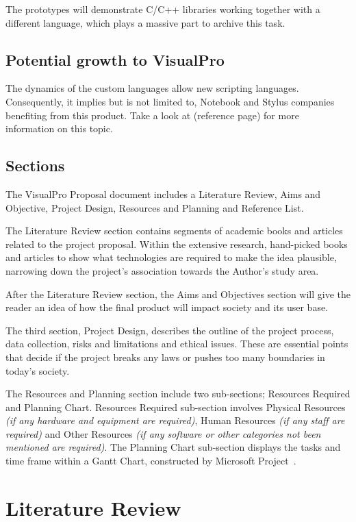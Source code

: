 \documentclass[conference]{IEEEtran}
\begin{document}
      The prototypes will demonstrate C/C++ libraries working together with a different language, which plays a massive part to archive this task.

      \subsection{Potential growth to VisualPro}
      The dynamics of the custom languages allow new scripting languages. Consequently, it implies but is not limited to, Notebook and Stylus companies benefiting from this product. Take a look at (reference page) for more information on this topic.

      \subsection{Sections}
      The VisualPro Proposal document includes a Literature Review, Aims and Objective, Project Design, Resources and Planning and Reference List.

      The Literature Review section contains segments of academic books and articles related to the project proposal. Within the extensive research, hand-picked books and articles to show what technologies are required to make the idea plausible, narrowing down the project's association towards the Author's study area.
      
      After the Literature Review section, the Aims and Objectives section will give the reader an idea of how the final product will impact society and its user base.
      
      The third section, Project Design, describes the outline of the project process, data collection, risks and limitations and ethical issues. These are essential points that decide if the project breaks any laws or pushes too many boundaries in today's society.
      
      The Resources and Planning section include two sub-sections; Resources Required and Planning Chart. Resources Required sub-section involves Physical Resources \textit{(if any hardware and equipment are required)}, Human Resources \textit{(if any staff are required)} and Other Resources \textit{(if any software or other categories not been mentioned are required)}. The Planning Chart sub-section displays the tasks and time frame within a Gantt Chart, constructed by Microsoft Project~\cite{microsoft_compare_nodate}.

    \section{Literature Review}
    \label{sec:literatureReview}
\end{document}
